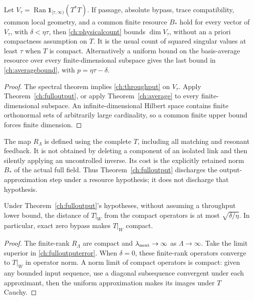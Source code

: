 \begin{corollary}
\label{ch:spectralcor}
Let $V_\tau=\operatorname{Ran}\mathbf1_{[\tau,\infty)}(T^*T)$.
If passage, absolute bypass, trace compatibility, common local geometry,
and a common finite resource $B_*$ hold for every vector of $V_\tau$,
with $\delta<\eta\tau$, then \eqref{ch:physicalcount} bounds
$\dim V_\tau$, without an a priori compactness assumption on $T$.
It is the usual count of squared singular values at least $\tau$ when
$T$ is compact.  Alternatively a uniform bound on the basis-average
resource over every finite-dimensional subspace gives the last bound in
\eqref{ch:averagebound}, with $p=\eta\tau-\delta$.
\end{corollary}
\begin{proof}
The spectral theorem implies \eqref{ch:throughput} on $V_\tau$.
Apply Theorem~\ref{ch:fulloutput}, or apply Theorem~\ref{ch:average}
to every finite-dimensional subspace.  An infinite-dimensional Hilbert
space contains finite orthonormal sets of arbitrarily large cardinality,
so a common finite upper bound forces finite dimension.
\end{proof}

The map $R_\Lambda$ is defined using the complete $T$, including all
matching and resonant feedback.  It is not obtained by deleting a component
of an isolated link and then silently applying an uncontrolled inverse.
Its cost is the explicitly retained norm $B_*$ of the actual full field.
Thus Theorem~\ref{ch:fulloutput} discharges the output-approximation step
under a resource hypothesis; it does not discharge that hypothesis.

\begin{corollary}
\label{ch:essential}
Under Theorem~\ref{ch:fulloutput}'s hypotheses, without assuming a
throughput lower bound, the distance of $T|_W$ from the compact operators
is at most $\sqrt{\delta/\eta}$.  In particular, exact zero bypass makes
$T|_W$ compact.
\end{corollary}
\begin{proof}
The finite-rank $R_\Lambda$ are compact and
$\lambda_{\rm next}\to\infty$ as $\Lambda\to\infty$.
Take the limit superior in \eqref{ch:fulloutputerror}.  When $\delta=0$,
these finite-rank operators converge to $T|_W$ in operator norm.
A norm limit of compact operators is compact: given any bounded input
sequence, use a diagonal subsequence convergent under each approximant,
then the uniform approximation makes its images under $T$ Cauchy.
\end{proof}

